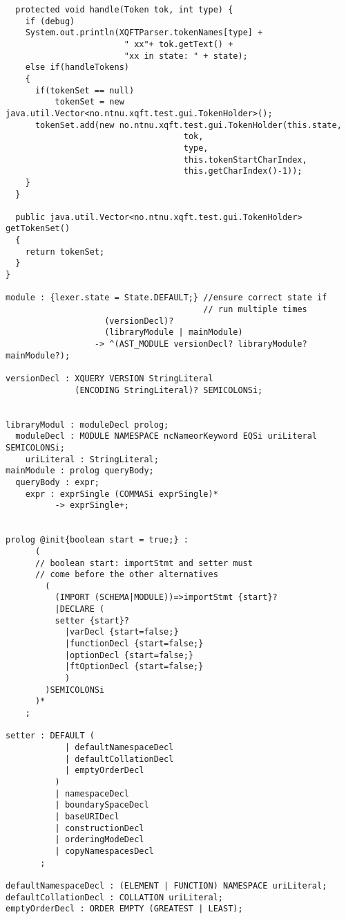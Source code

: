 \begin{verbatim}
  protected void handle(Token tok, int type) {
    if (debug) 
    System.out.println(XQFTParser.tokenNames[type] + 
                        " xx"+ tok.getText() +
                        "xx in state: " + state);
    else if(handleTokens)
    {
      if(tokenSet == null)
          tokenSet = new java.util.Vector<no.ntnu.xqft.test.gui.TokenHolder>();
      tokenSet.add(new no.ntnu.xqft.test.gui.TokenHolder(this.state,
                                    tok,
                                    type,
                                    this.tokenStartCharIndex,
                                    this.getCharIndex()-1));
    }
  }

  public java.util.Vector<no.ntnu.xqft.test.gui.TokenHolder> getTokenSet()
  {
    return tokenSet;
  }
}

module : {lexer.state = State.DEFAULT;} //ensure correct state if 
                                        // run multiple times
                    (versionDecl)? 
                    (libraryModule | mainModule)
                  -> ^(AST_MODULE versionDecl? libraryModule? mainModule?);

versionDecl : XQUERY VERSION StringLiteral 
              (ENCODING StringLiteral)? SEMICOLONSi;


libraryModul : moduleDecl prolog;
  moduleDecl : MODULE NAMESPACE ncNameorKeyword EQSi uriLiteral SEMICOLONSi;
    uriLiteral : StringLiteral;
mainModule : prolog queryBody;
  queryBody : expr;
    expr : exprSingle (COMMASi exprSingle)* 
          -> exprSingle+;


prolog @init{boolean start = true;} :
      (
      // boolean start: importStmt and setter must 
      // come before the other alternatives
        (
          (IMPORT (SCHEMA|MODULE))=>importStmt {start}?
          |DECLARE (
          setter {start}?
            |varDecl {start=false;}
            |functionDecl {start=false;}
            |optionDecl {start=false;}
            |ftOptionDecl {start=false;}
            )
        )SEMICOLONSi
      )*
    ;

setter : DEFAULT (
            | defaultNamespaceDecl
            | defaultCollationDecl
            | emptyOrderDecl
          )
          | namespaceDecl
          | boundarySpaceDecl
          | baseURIDecl 
          | constructionDecl 
          | orderingModeDecl 
          | copyNamespacesDecl
       ;

defaultNamespaceDecl : (ELEMENT | FUNCTION) NAMESPACE uriLiteral;
defaultCollationDecl : COLLATION uriLiteral;
emptyOrderDecl : ORDER EMPTY (GREATEST | LEAST);


\end{verbatim}
